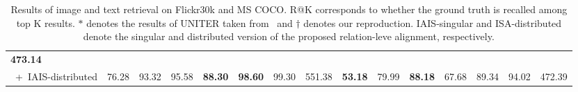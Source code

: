 \documentclass[11pt,a4paper]{article}
\begin{document}
\begin{table*}[t]
\begin{adjustbox}{max width=\textwidth}
\begin{tabular}{@{}lcccccccccccccc@{}}
  \textbf{473.14} \\
~+~IAIS-distributed &
  76.28 &
  93.32 &
  95.58 &
  \textbf{88.30} &
  \textbf{98.60} &
  99.30 &
  551.38 &
  \textbf{53.18} &
  79.99 &
  \textbf{88.18} &
  67.68 &
  89.34 &
  94.02 &
  472.39 \\ \bottomrule
\end{tabular}
\end{adjustbox}
\caption{Results of image and text retrieval on Flickr30k and MS COCO. 
R@K corresponds to whether the ground truth is recalled among top K results. 
$*$ denotes the results of UNITER taken from~\citet{UNITER} and {$\dagger$} denotes our reproduction. IAIS-singular and ISA-distributed denote the singular and distributed version of the proposed relation-leve alignment, respectively. }
\label{tb:main-results}
\end{table*}


%
 
\end{document}
